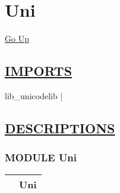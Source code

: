 \chapter*{\color{headfile}
Uni
}
\hypertarget{ecldoc:toc:Uni}{}
\hyperlink{ecldoc:toc:root}{Go Up}

\section*{\underline{\textsf{IMPORTS}}}
\begin{doublespace}
{\large
lib\_unicodelib |
}
\end{doublespace}

\section*{\underline{\textsf{DESCRIPTIONS}}}
\subsection*{\textsf{\colorbox{headtoc}{\color{white} MODULE}
Uni}}

\hypertarget{ecldoc:Uni}{}

{\renewcommand{\arraystretch}{1.5}
\begin{tabularx}{\textwidth}{|>{\raggedright\arraybackslash}l|X|}
\hline
\hspace{0pt}\mytexttt{\color{red} } & \textbf{Uni} \\
\hline
\end{tabularx}
}

\par


